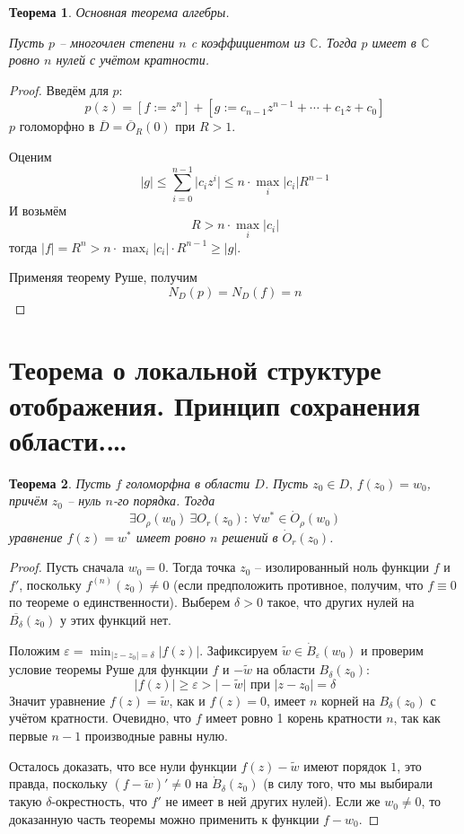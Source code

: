 \documentclass[a4paper,12pt]{article}
\renewcommand{\leq}{\ensuremath{\leqslant}}
\renewcommand{\geq}{\ensuremath{\geqslant}}
\theoremstyle{plain}
\newtheorem{theorem}{Теорема}[section]
\theoremstyle{definition}
\theoremstyle{remark}
\begin{document}
\begin{theorem}
	Основная теорема алгебры.

	Пусть $p$ -- многочлен степени $n$ c коэффициентом из $\mathbb{C}$. Тогда $p$ имеет в $\mathbb{C}$ ровно $n$ нулей с учётом кратности.
\end{theorem}

\begin{proof}
	Введём для $p$:
	\[
		p(z) = [f := z^n] + [g := c_{n - 1}z^{n - 1} + \cdots + c_1z + c_0]
	\]
	$p$ голоморфно в $\overline{D} = \overline{O}_R(0)$ при $R > 1$.

	Оценим
	\[
		\vert g\vert \leq \sum_{i = 0}^{n - 1}\vert c_iz^i\vert \leq n\cdot\max_i\vert c_i\vert R^{n - 1}
	\]
	И возьмём
	\[
		R > n\cdot\max_i\vert c_i\vert
	\]
	тогда $\vert f\vert = R^n > n\cdot\max_i\vert c_i\vert\cdot R^{n - 1} \geq \vert g\vert$.

	Применяя теорему Руше, получим
	\[
		N_D(p) = N_D(f) = n
	\]
\end{proof}

\section{Теорема о локальной структуре отображения. Принцип сохранения области.\dots}
\begin{theorem}
	Пусть $f$ голоморфна в области $D$. Пусть $z_0 \in D,\, f(z_0) = w_0$, причём $z_0$ -- нуль $n$-го порядка. Тогда
	\[
		\exists O_\rho(w_0) \: \exists O_r(z_0) :\: \forall w^* \in \dot{O}_\rho(w_0)
	\]
	уравнение $f(z) = w^*$ имеет ровно $n$ решений в $\dot{O}_r(z_0)$.
\end{theorem}

\begin{proof}
	Пусть сначала $w_0 = 0$. Тогда точка $z_0$ -- изолированный ноль функции $f$ и $f'$, поскольку $f^{(n)}(z_0) \neq 0$ (если предположить противное, получим, что $f \equiv 0$ по теореме о единственности). Выберем $\delta > 0$ такое, что других нулей на $\overline{B_\delta}(z_0)$ у этих функций нет.

	Положим $\varepsilon = \min_{\vert z - z_0\vert = \delta}\vert f(z)\vert$. Зафиксируем $\tilde{w} \in \dot{B}_\varepsilon(w_0)$ и проверим условие теоремы Руше для функции $f$ и $-\tilde{w}$ на области $B_\delta(z_0)$:
	\[
		\vert f(z)\vert \geq \varepsilon > \vert -\tilde{w}\vert \text{ при }\vert z - z_0\vert = \delta
	\]
	Значит уравнение $f(z) = \tilde{w}$, как и $f(z) = 0$, имеет $n$ корней на $B_\delta(z_0)$ с учётом кратности. Очевидно, что $f$ имеет ровно 1 корень кратности $n$, так как первые $n - 1$ производные равны нулю.

	Осталось доказать, что все нули функции $f(z) - \tilde{w}$ имеют порядок $1$, это правда, поскольку $(f - \tilde{w})' \neq 0$ на $\dot{B}_\delta(z_0)$ (в силу того, что мы выбирали такую $\delta$-окрестность, что $f'$ не имеет в ней других нулей). Если же $w_0 \neq 0$, то доказанную часть теоремы можно применить к функции $f - w_0$.
\end{proof}
\end{document}
